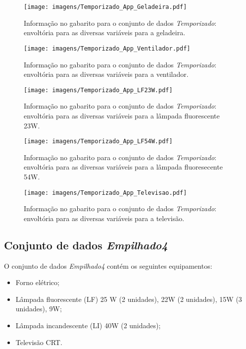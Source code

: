 \begin{sidewaysfigure}[p]
\centering
\texttt{[image: imagens/Temporizado\_App\_Geladeira.pdf]}
\caption{Informação no gabarito para o conjunto de dados
\emph{Temporizado}: envoltória para as diversas variáveis para a
geladeira.}
\label{fig:temporizado_geladeira}
\end{sidewaysfigure}

\begin{sidewaysfigure}[p]
\centering
\texttt{[image: imagens/Temporizado\_App\_Ventilador.pdf]}
\caption{Informação no gabarito para o conjunto de dados
\emph{Temporizado}: envoltória para as diversas variáveis para a
ventilador.}
\label{fig:temporizado_ventilador}
\end{sidewaysfigure}

\begin{sidewaysfigure}[p]
\centering
\texttt{[image: imagens/Temporizado\_App\_LF23W.pdf]}
\caption{Informação no gabarito para o conjunto de dados
\emph{Temporizado}: envoltória para as diversas variáveis para a
lâmpada fluorescente 23W.}
\label{fig:temporizado_lf23}
\end{sidewaysfigure}

\begin{sidewaysfigure}[p]
\centering
\texttt{[image: imagens/Temporizado\_App\_LF54W.pdf]}
\caption{Informação no gabarito para o conjunto de dados
\emph{Temporizado}: envoltória para as diversas variáveis para a
lâmpada fluoresecente 54W.}
\label{fig:temporizado_lf54}
\end{sidewaysfigure}

\begin{sidewaysfigure}[p]
\centering
\texttt{[image: imagens/Temporizado\_App\_Televisao.pdf]}
\caption{Informação no gabarito para o conjunto de dados
\emph{Temporizado}: envoltória para as diversas variáveis para a
televisão.}
\label{fig:temporizado_televisao}
\end{sidewaysfigure}

\FloatBarrier

\subsection{Conjunto de dados \emph{Empilhado4}}
\label{ssec:emp4}

O conjunto de dados \emph{Empilhado4} contém os seguintes
equipamentos:

\begin{itemize}
\item Forno elétrico;
\item Lâmpada fluorescente (LF) 25 W (2 unidades), 22W (2 unidades), 15W (3
unidades), 9W;
\item Lâmpada incandescente (LI) 40W (2 unidades);
\item Televisão CRT.
\end{itemize}

